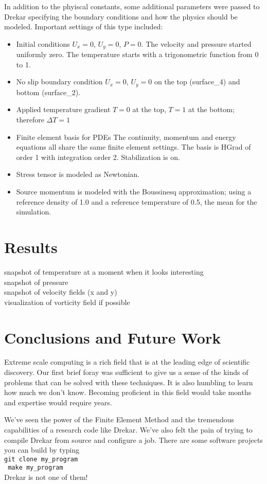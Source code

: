 \documentclass[11pt]{article} %
\newcommand{\tty}[1]{\texttt{#1}}
\begin{document}
In addition to the phyiscal constants, some additional parameters were passed to Drekar 
specifying the boundary conditions and how the physics should be modeled.
Important settings of this type included:
\begin{itemize}
\item{Initial conditions} $U_x = 0$, $U_y = 0$, $P = 0$.  The velocity and pressure started uniformly zero.
The temperature starts with a trigonometric function from 0 to 1.
\item{No slip boundary condition} $U_x = 0$, $U_y = 0$ 
on the top (surface\_4) and bottom (surface\_2).
\item{Applied temperature gradient} $T=0$ at the top, $T=1$ at the bottom; therefore $\Delta T = 1$
\item{Finite element basis for PDEs} The continuity, momentum and energy equations all share the same
finite element settings.  The basis is HGrad of order 1 with integration order 2.  Stabilization is on.
\item{Stress tensor} is modeled as Newtonian.
\item{Source momentum} is modeled with the Boussinesq approximation; 
using a reference density of 1.0 and a reference temperature of 0.5, the mean for the simulation.
\end{itemize}

\section{Results}
snapshot of temperature at a moment when it looks interesting \\
snapshot of pressure \\
snapshot of velocity fields (x and y) \\
visualization of vorticity field if possible

\section{Conclusions and Future Work}
Extreme scale computing is a rich field that is at the leading edge of scientific discovery.
Our first brief foray was sufficient to give us a sense of the kinds of problems that can
be solved with these techniques.  
It is also humbling to learn how much we don't know.  
Becoming proficient in this field would take months and expertise would require years.

We've seen the power of the Finite Element Method and the tremendous capabilities of 
a research code like Drekar.  
We've also felt the pain of trying to compile Drekar from source and configure a job.
There are some software projects you can build by typing\\
\tty{git clone my\_program}\\
\tty{ make my\_program} \\
Drekar is not one of them!
\end{document}

